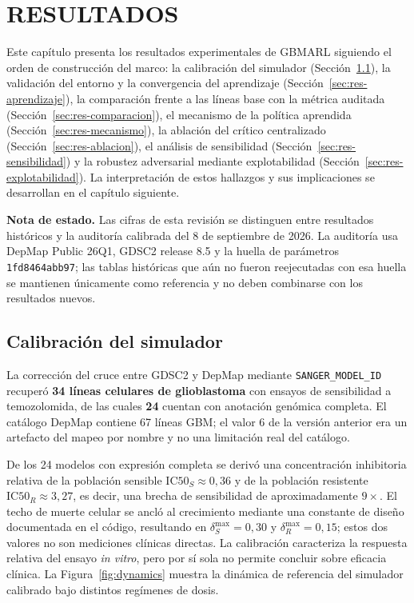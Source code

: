 \chapter{RESULTADOS}
\label{cap:resultados}

Este capítulo presenta los resultados experimentales de GBMARL siguiendo el orden de construcción del marco: la calibración del simulador (Sección~\ref{sec:res-calibracion}), la validación del entorno y la convergencia del aprendizaje (Sección~\ref{sec:res-aprendizaje}), la comparación frente a las líneas base con la métrica auditada (Sección~\ref{sec:res-comparacion}), el mecanismo de la política aprendida (Sección~\ref{sec:res-mecanismo}), la ablación del crítico centralizado (Sección~\ref{sec:res-ablacion}), el análisis de sensibilidad (Sección~\ref{sec:res-sensibilidad}) y la robustez adversarial mediante explotabilidad (Sección~\ref{sec:res-explotabilidad}). La interpretación de estos hallazgos y sus implicaciones se desarrollan en el capítulo siguiente.

\textbf{Nota de estado.} Las cifras de esta revisión se distinguen entre resultados históricos y la auditoría calibrada del 8 de septiembre de 2026. La auditoría usa DepMap Public 26Q1, GDSC2 release 8.5 y la huella de parámetros \texttt{1fd8464abb97}; las tablas históricas que aún no fueron reejecutadas con esa huella se mantienen únicamente como referencia y no deben combinarse con los resultados nuevos.

\section{Calibración del simulador}
\label{sec:res-calibracion}

La corrección del cruce entre GDSC2 y DepMap mediante \texttt{SANGER\_MODEL\_ID} recuperó \textbf{34 líneas celulares de glioblastoma} con ensayos de sensibilidad a temozolomida, de las cuales \textbf{24} cuentan con anotación genómica completa. El catálogo DepMap contiene 67 líneas GBM; el valor 6 de la versión anterior era un artefacto del mapeo por nombre y no una limitación real del catálogo.

De los 24 modelos con expresión completa se derivó una concentración inhibitoria relativa de la población sensible $\mathrm{IC50}_S \approx 0{,}36$ y de la población resistente $\mathrm{IC50}_R \approx 3{,}27$, es decir, una brecha de sensibilidad de aproximadamente $9\times$. El techo de muerte celular se ancló al crecimiento mediante una constante de diseño documentada en el código, resultando en $\delta_S^{\max} = 0{,}30$ y $\delta_R^{\max} = 0{,}15$; estos dos valores no son mediciones clínicas directas. La calibración caracteriza la respuesta relativa del ensayo \emph{in vitro}, pero por sí sola no permite concluir sobre eficacia clínica. La Figura~\ref{fig:dynamics} muestra la dinámica de referencia del simulador calibrado bajo distintos regímenes de dosis.

